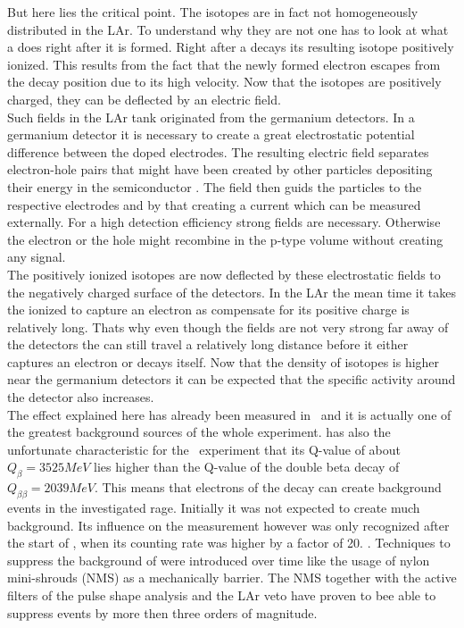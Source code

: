 \documentclass[encoding=utf8,british]{tumphthesis}
\begin{document}
But here lies the critical point.
The  isotopes are in fact not homogeneously distributed in the LAr.
To understand why they are not one has to look at what a  does right after it is formed.
Right after a  decays its resulting  isotope positively ionized.
This results from the fact that the newly formed electron escapes from the decay position due to its high velocity.
Now that the  isotopes are positively charged, they can be deflected by an electric field.
\\

Such fields in the LAr tank originated from the germanium detectors.
In a germanium detector it is necessary to create a great electrostatic potential difference between the doped electrodes.
The resulting electric field separates electron-hole pairs that might have been created by other particles depositing their energy in the semiconductor \cite{spieler_semiconductor_2005}.
The field then guids the particles to the respective electrodes and by that creating a current which can be measured externally.
For a high detection efficiency strong fields are necessary.
Otherwise the electron or the hole might recombine in the p-type volume without creating any signal.
\\

The positively ionized isotopes are now deflected by these electrostatic fields to the negatively charged surface of the detectors. 
In the LAr the mean time it takes the ionized  to capture an electron as compensate for its positive charge is relatively long. 
Thats why even though the fields are not very strong far away of the detectors the  can still travel a relatively long distance before it either captures an electron or decays itself. 
Now that the density of  isotopes is higher near the germanium detectors it can be expected that the specific activity around the detector also increases.
\\

The effect explained here has already been measured in \gerda\ and it is actually one of the greatest background sources of the whole experiment.
 has also the unfortunate characteristic for the \gerda\ experiment that its Q-value of about $Q_\beta =3525\unit{MeV}$ lies higher than the Q-value of the double beta decay of  $Q_{\beta \beta} = 2039\unit{MeV}$.
This means that electrons of the  decay can create background events in the investigated rage. 
Initially it was not expected to create much background.
Its influence on the measurement however was only recognized after the start of \PI, when its counting rate was higher by a factor of 20. \cite{becerici_schmidt_results_2014}.
Techniques to suppress the background of  were introduced over time like the usage of nylon mini-shrouds (NMS) as a mechanically barrier.
The NMS together with the active filters of the pulse shape analysis and the LAr veto have proven to bee able to suppress  events by more then three orders of magnitude.
\\
\end{document}
